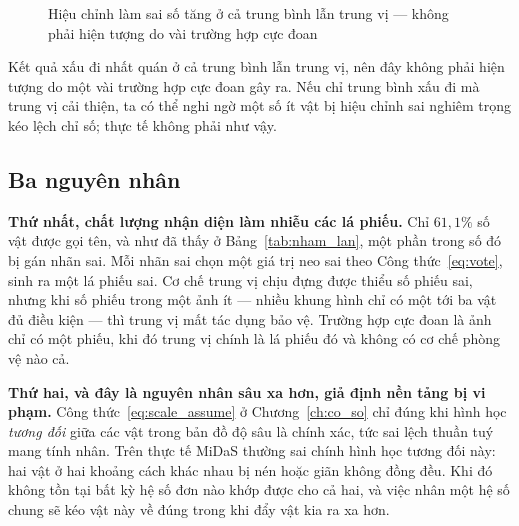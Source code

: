 \begin{figure}[H]
\centering
{}
\caption{Hiệu chỉnh làm sai số tăng ở cả trung bình lẫn trung vị --- không phải hiện tượng do
vài trường hợp cực đoan}
\label{fig:hc_chart}
\end{figure}

Kết quả xấu đi nhất quán ở cả trung bình lẫn trung vị, nên đây không phải hiện tượng do một vài
trường hợp cực đoan gây ra. Nếu chỉ trung bình xấu đi mà trung vị cải thiện, ta có thể nghi ngờ
một số ít vật bị hiệu chỉnh sai nghiêm trọng kéo lệch chỉ số; thực tế không phải như vậy.

\subsection{Ba nguyên nhân}

\textbf{Thứ nhất, chất lượng nhận diện làm nhiễu các lá phiếu.} Chỉ $61{,}1\%$ số vật được gọi
tên, và như đã thấy ở Bảng~\ref{tab:nham_lan}, một phần trong số đó bị gán nhãn sai. Mỗi nhãn
sai chọn một giá trị neo sai theo Công thức~\eqref{eq:vote}, sinh ra một lá phiếu sai. Cơ chế
trung vị chịu đựng được thiểu số phiếu sai, nhưng khi số phiếu trong một ảnh ít --- nhiều khung
hình chỉ có một tới ba vật đủ điều kiện --- thì trung vị mất tác dụng bảo vệ. Trường hợp cực
đoan là ảnh chỉ có một phiếu, khi đó trung vị chính là lá phiếu đó và không có cơ chế phòng vệ
nào cả.

\textbf{Thứ hai, và đây là nguyên nhân sâu xa hơn, giả định nền tảng bị vi phạm.}
Công thức~\eqref{eq:scale_assume} ở Chương~\ref{ch:co_so} chỉ đúng khi hình học \emph{tương đối}
giữa các vật trong bản đồ độ sâu là chính xác, tức sai lệch thuần tuý mang tính nhân. Trên thực
tế MiDaS thường sai chính hình học tương đối này: hai vật ở hai khoảng cách khác nhau bị nén
hoặc giãn không đồng đều. Khi đó không tồn tại bất kỳ hệ số đơn nào khớp được cho cả hai, và
việc nhân một hệ số chung sẽ kéo vật này về đúng trong khi đẩy vật kia ra xa hơn.

